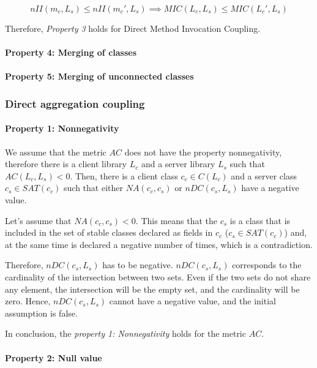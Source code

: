 \begin{equation*}
   nII(m_c, L_s) \le nII(m_c', L_s) \implies MIC(L_c, L_s) \le MIC(L_c', L_s)
\end{equation*}

\blankls
Therefore, \textit{Property 3} holds for Direct Method Invocation Coupling.

\paragraph{Property 4: Merging of classes}

\paragraph{Property 5: Merging of unconnected classes}

\subsubsection{Direct aggregation coupling}
\paragraph{Property 1: Nonnegativity}
We assume that the metric $AC$ does not have the property nonnegativity, therefore there is a client library $L_c$ and a server library $L_s$ such that $AC(L_c, L_s) < 0$. Then, there is a client class $c_c \in C(L_c)$ and a server class $c_s \in SAT(c_c)$ such that either $NA(c_c, c_s)$ or $nDC(c_s, L_s)$ have a negative value.

Let's assume that $NA(c_c, c_s) < 0$. This means that the $c_s$ is a class that is included in the set of stable classes declared as fields in $c_c$ ($c_s \in SAT(c_c)$) and, at the same time is declared a negative number of times, which is a contradiction.

Therefore, $nDC(c_s, L_s)$ has to be negative. $nDC(c_s, L_s)$ corresponds to the cardinality of the intersection between two sets. Even if the two sets do not share any element, the intersection will be the empty set, and the cardinality will be zero. Hence, $nDC(c_s, L_s)$ cannot have a negative value, and the initial assumption is false.

In conclusion, the \textit{property 1: Nonnegativity} holds for the metric $AC$.

\paragraph{Property 2: Null value}

